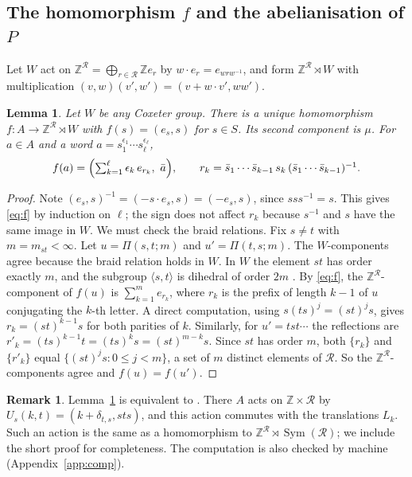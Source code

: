 \documentclass[11pt]{amsart}
\newtheorem{lemma}[theorem]{Lemma}
\theoremstyle{definition}
\newtheorem{remark}[theorem]{Remark}
\newcommand{\Z}{\mathbb{Z}}
\newcommand{\R}{\mathcal{R}}
\newcommand{\Sym}{\operatorname{Sym}}
\begin{document}
\subsection{The homomorphism $f$ and the abelianisation of $P$}\label{sec:f}
Let $W$ act on $\Z^\R=\bigoplus_{r\in\R}\Z e_r$ by $w\cdot e_r=e_{wrw^{-1}}$, and form $\Z^\R\rtimes W$ with
multiplication $(v,w)(v',w')=(v+w\cdot v',ww')$.

\begin{lemma}\label{lem:f}
Let $W$ be any Coxeter group. There is a unique homomorphism $f\colon A\to\Z^\R\rtimes W$ with $f(s)=(e_s,s)$ for
$s\in S$. Its second component is $\mu$. For $a\in A$ and a word $a=s_1^{\epsilon_1}\cdots s_\ell^{\epsilon_\ell}$,
\begin{equation}\label{eq:f}
f(a)=\Bigl(\textstyle\sum_{k=1}^{\ell}\epsilon_k\,e_{r_k},\ \bar a\Bigr),\qquad r_k=\bar s_1\cdots\bar s_{k-1}\,s_k\,(\bar s_1\cdots \bar s_{k-1})^{-1}.
\end{equation}
\end{lemma}

\begin{proof}
Note $(e_s,s)^{-1}=(-s\cdot e_s,s)=(-e_s,s)$, since $ss s^{-1}=s$. This gives \eqref{eq:f} by induction on
$\ell$; the sign does not affect $r_k$ because $s^{-1}$ and $s$ have the same image in $W$. We must check the
braid relations. Fix $s\ne t$ with $m=m_{st}<\infty$. Let $u=\Pi(s,t;m)$ and $u'=\Pi(t,s;m)$. The $W$-components agree because the braid relation holds in $W$. In $W$ the element $st$ has order exactly
$m$, and the subgroup $\langle s,t\rangle$ is dihedral of order $2m$ \cite[\S5.3]{Hum90}. By \eqref{eq:f}, the
$\Z^\R$-component of $f(u)$ is $\sum_{k=1}^me_{r_k}$, where $r_k$ is the prefix of length $k-1$ of $u$ conjugating
the $k$-th letter. A direct computation, using $s(ts)^j=(st)^js$, gives $r_k=(st)^{k-1}s$ for both parities of
$k$. Similarly, for $u'=tst\cdots$ the reflections are $r'_k=(ts)^{k-1}t=(ts)^ks=(st)^{m-k}s$. Since $st$ has order
$m$, both $\{r_k\}$ and $\{r'_k\}$ equal $\{(st)^js:0\le j<m\}$, a set of $m$ distinct elements of $\R$. So the
$\Z^\R$-components agree and $f(u)=f(u')$.
\end{proof}

\begin{remark}
Lemma~\ref{lem:f} is equivalent to \cite[Lemma~3.7(1)]{CP03}. There $A$ acts on $\Z\times\R$ by
$U_s(k,t)=(k+\delta_{t,s},sts)$, and this action commutes with the translations $L_k$. Such an action is the same
as a homomorphism to $\Z^\R\rtimes\Sym(\R)$; we include the short proof for completeness. The computation is also
checked by machine (Appendix~\ref{app:comp}).
\end{remark}
\end{document}
